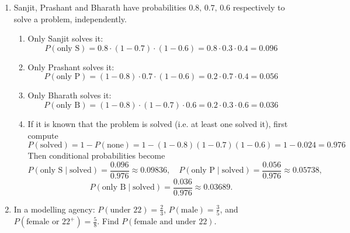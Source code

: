 \begin{enumerate}
\begin{enumerate}
        $$P(\text{all distinct})=\frac{365\cdot 364\cdot 363\cdot 362\cdot 361}{365^5}$$
        \item Probability exactly two persons share a birthday (and the other three all have distinct birthdays different from that one):
        \[
        P(\text{exactly one pair})=\binom{5}{2}\cdot 365 \cdot \frac{364\cdot 363\cdot 362}{365^5}
        \]
        Here $\binom{5}{2}$ chooses which two form the pair, $365$ chooses the common birthday for the pair, and $P(364,3)=364\cdot363\cdot362$ assigns distinct birthdays to the remaining three from the remaining days.
    \end{enumerate}
    \item Sanjit, Prashant and Bharath have probabilities $0.8,\,0.7,\,0.6$ respectively to solve a problem, independently.
    \begin{enumerate}
        \item Only Sanjit solves it:
        $$P(\text{only S})=0.8\cdot(1-0.7)\cdot(1-0.6)=0.8\cdot 0.3\cdot 0.4=0.096$$
        \item Only Prashant solves it:
        $$P(\text{only P})=(1-0.8)\cdot 0.7\cdot(1-0.6)=0.2\cdot 0.7\cdot 0.4=0.056$$
        \item Only Bharath solves it:
        $$P(\text{only B})=(1-0.8)\cdot(1-0.7)\cdot 0.6=0.2\cdot 0.3\cdot 0.6=0.036$$
        \item If it is known that the problem is solved (i.e. at least one solved it), first compute
        $$P(\text{solved})=1-P(\text{none})=1-(1-0.8)(1-0.7)(1-0.6)=1-0.024=0.976$$
        Then conditional probabilities become
        \[
        P(\text{only S}\mid\text{solved})=\frac{0.096}{0.976}\approx 0.09836,\quad
        P(\text{only P}\mid\text{solved})=\frac{0.056}{0.976}\approx 0.05738,
        \]
        \[
        P(\text{only B}\mid\text{solved})=\frac{0.036}{0.976}\approx 0.03689.
        \]
    \end{enumerate}
    \item In a modelling agency: $P(\text{under }22)=\tfrac{2}{3}$, $P(\text{male})=\tfrac{3}{5}$, and $P(\text{female or }22^+)=\tfrac{5}{8}$. Find $P(\text{female and under }22)$.
    

\end{enumerate}
